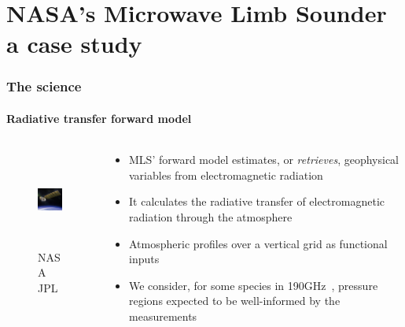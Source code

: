 \documentclass{snedecorbeamer}
\newcommand{\citep}[1]{}
\begin{document}
\section{NASA's Microwave Limb Sounder \\ {\small a case study}}

\begin{frame}[c]
  \frametitle{The science}
  \framesubtitle{Radiative transfer forward model}

  \begin{columns}[c]
    \begin{column}{0.2\textwidth}
      \begin{figure}
        \centering
        \includegraphics[height=8.5em]{inc/mls_aura}
        \caption*{
          \href{https://www.jpl.nasa.gov/missions/microwave-limb-sounder-mls}{}
          NASA JPL}
      \end{figure}
    \end{column}
    \begin{column}{0.7\textwidth}
      \begin{itemize}
      \item MLS' forward model estimates, or \emph{retrieves}, geophysical
        variables from electromagnetic radiation
      \item It calculates the radiative transfer of electromagnetic radiation
        through the atmosphere~\cite{read2006,schwartz2006}
      \item Atmospheric profiles over a vertical grid as functional inputs
      \item We consider, for some species in 190GHz~\cite{waters2006},
        pressure regions expected to be well-informed by the
        measurements~\cite{liversey2020}
      \end{itemize}
    \end{column}
  \end{columns}
\end{frame}
\end{document}
